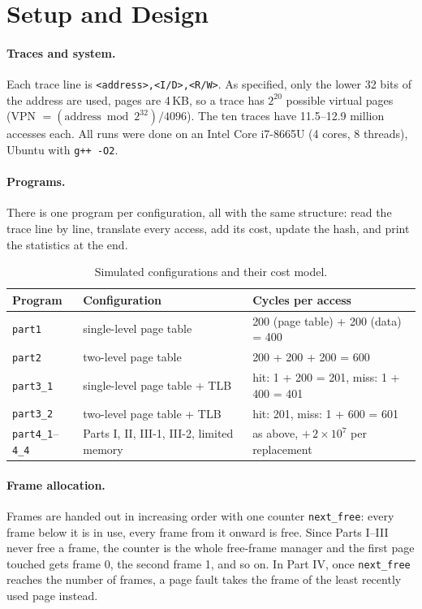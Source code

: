 \documentclass[11pt,a4paper]{article}
\begin{document}
\section{Setup and Design}

\paragraph{Traces and system.} Each trace line is \texttt{<address>,<I/D>,<R/W>}. As specified,
only the lower 32 bits of the address are used, pages are 4\,KB, so a trace has
$2^{20}$ possible virtual pages (VPN $=(\text{address} \bmod 2^{32}) / 4096$). The ten traces have
11.5--12.9 million accesses each. All runs were done on an Intel Core i7-8665U (4 cores, 8
threads), Ubuntu with \texttt{g++ -O2}.

\paragraph{Programs.} There is one program per configuration, all with the same structure: read
the trace line by line, translate every access, add its cost, update the hash, and print the
statistics at the end.

\begin{table}[H]
\centering\small
\setlength{\tabcolsep}{5pt}
\begin{tabular}{@{}lll@{}}
\toprule
Program & Configuration & Cycles per access \\
\midrule
\texttt{part1}   & single-level page table          & 200 (page table) + 200 (data) = 400 \\
\texttt{part2}   & two-level page table             & 200 + 200 + 200 = 600 \\
\texttt{part3\_1} & single-level page table + TLB    & hit: 1 + 200 = 201, \quad miss: 1 + 400 = 401 \\
\texttt{part3\_2} & two-level page table + TLB       & hit: 201, \quad miss: 1 + 600 = 601 \\
\texttt{part4\_1}--\texttt{4\_4} & Parts I, II, III-1, III-2, limited memory & as above, $+\,2\times10^{7}$ per replacement \\
\bottomrule
\end{tabular}
\caption{Simulated configurations and their cost model.}
\label{tab:configs}
\end{table}

\paragraph{Frame allocation.} Frames are handed out in increasing order with one counter
\texttt{next\_free}: every frame below it is in use, every frame from it onward is free. Since
Parts I--III never free a frame, the counter is the whole free-frame manager and the first page
touched gets frame 0, the second frame 1, and so on. In Part IV, once \texttt{next\_free} reaches
the number of frames, a page fault takes the frame of the least recently used page instead.
\end{document}
